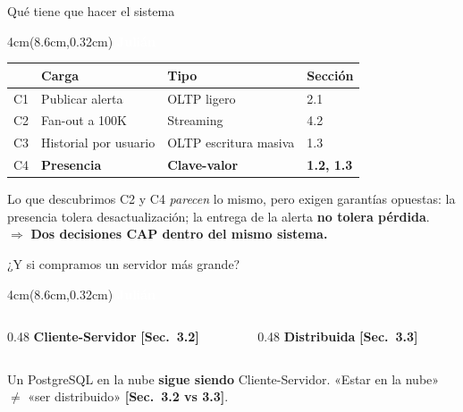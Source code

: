\documentclass[aspectratio=169,11pt]{beamer}
\newcommand{\sect}[1]{\textcolor{acento}{\small\textbf{[Sec.~#1]}}}
\newcommand{\quien}[1]{%
  \begin{textblock*}{4cm}(8.6cm,0.32cm)
    \tiny\textcolor{white}{\textbf{#1}}
  \end{textblock*}}
\begin{document}
\begin{frame}{Qué tiene que hacer el sistema}
\quien{Julián}
\centering\small
\begin{tabular}{@{}llll@{}}
\toprule
 & \textbf{Carga} & \textbf{Tipo} & \textbf{Sección} \\
\midrule
C1 & Publicar alerta & OLTP ligero & 2.1 \\
C2 & Fan-out a 100K & Streaming & 4.2 \\
C3 & Historial por usuario & OLTP escritura masiva & 1.3 \\
C4 & \textbf{Presencia} & \textbf{Clave-valor} & \textbf{1.2, 1.3} \\
\bottomrule
\end{tabular}
\vspace{12pt}
\begin{block}{Lo que descubrimos}
\small C2 y C4 \emph{parecen} lo mismo, pero exigen garantías opuestas:
la presencia tolera desactualización; la entrega de la alerta \textbf{no tolera pérdida}.\\
$\Rightarrow$ \textbf{Dos decisiones CAP dentro del mismo sistema.}
\end{block}
\end{frame}

\begin{frame}{¿Y si compramos un servidor más grande?}
\quien{Julián}
\begin{columns}[T]
\begin{column}{0.48\textwidth}
\centering\textbf{Cliente-Servidor} \sect{3.2}
\end{column}
\begin{column}{0.48\textwidth}
\centering\textbf{Distribuida} \sect{3.3}
\end{column}
\end{columns}
\vspace{10pt}
\begin{alertblock}{}
\small Un PostgreSQL en la nube \textbf{sigue siendo} Cliente-Servidor.
«Estar en la nube» $\neq$ «ser distribuido» \sect{3.2 vs 3.3}.
\end{alertblock}
\end{frame}
\end{document}
